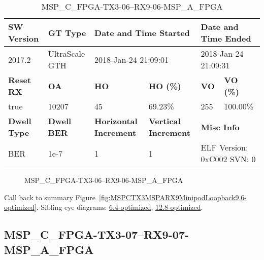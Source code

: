 \begin{table}[h]
\centering
\caption{MSP\_C\_FPGA-TX3-06--RX9-06-MSP\_A\_FPGA}
\label{tab:MSPCFPGATX306RX906MSPAFPGA9.6-optimized}
\begin{tabular}{@{}|l|l|l|l|l|l|@{}}
\toprule
\textbf{SW Version}                & \textbf{GT Type}   & \multicolumn{2}{l|}{\textbf{Date and Time Started}}            & \multicolumn{2}{l|}{\textbf{Date and Time Ended}}        \\ \midrule
2017.2                       & UltraScale GTH          & \multicolumn{2}{l|}{2018-Jan-24 21:09:01}                   & \multicolumn{2}{l|}{2018-Jan-24 21:09:31}               \\ \midrule
\textbf{Reset RX}                  & \textbf{OA} & \textbf{HO}   & \textbf{HO (\%)} & \textbf{VO} & \textbf{VO (\%)} \\ \midrule
true & 10207        & 45          & 69.23\%        & 255        & 100.00\%       \\ \midrule
\textbf{Dwell Type}                & \textbf{Dwell BER} & \textbf{Horizontal Increment} & \textbf{Vertical Increment}    & \multicolumn{2}{l|}{\textbf{Misc Info}}                  \\ \midrule
BER                            & 1e-7        & 1        & 1           & \multicolumn{2}{l|}{ELF Version: 0xC002 SVN: 0}                         \\ \bottomrule
\end{tabular}
\end{table}

\begin{figure}[h]
\caption{MSP\_C\_FPGA-TX3-06--RX9-06-MSP\_A\_FPGA} \label{fig:MSPCFPGATX306RX906MSPAFPGA9.6-optimized}
\end{figure}

Call back to summary Figure~\ref{fig:MSPCTX3MSPARX9MinipodLoopback9.6-optimized}.
Sibling eye diagrams: \hyperref[sec:MSPCFPGATX306RX906MSPAFPGA6.4-optimized]{6.4-optimized}, \hyperref[sec:MSPCFPGATX306RX906MSPAFPGA12.8-optimized]{12.8-optimized}.

\clearpage
\newpage


\subsection{MSP\_C\_FPGA-TX3-07--RX9-07-MSP\_A\_FPGA}\label{sec:MSPCFPGATX307RX907MSPAFPGA9.6-optimized}

